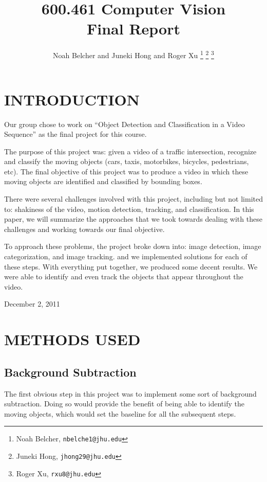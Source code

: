\documentclass[a4paper, 10pt, conference]{ieeeconf}      %
\title{\LARGE \bf
600.461 Computer Vision\\Final Report
}
\author{Noah Belcher and Juneki Hong and Roger Xu%
\thanks{Noah Belcher,
        {\tt\small nbelche1@jhu.edu}}%
\thanks{Juneki Hong,
        {\tt\small jhong29@jhu.edu}}%
\thanks{Roger Xu,
		{\tt\small rxu8@jhu.edu}}%
}
\begin{document}
\maketitle
\thispagestyle{empty}
\pagestyle{empty}


\section{INTRODUCTION}

Our group chose to work on “Object Detection and Classification in a Video Sequence” as the final project for this course. \newline

The purpose of this project was: given a video of a traffic intersection, recognize and classify the moving objects (cars, taxis, motorbikes, bicycles, pedestrians, etc). The final objective of this project was to produce a video in which these moving objects are identified and classified by bounding boxes. \newline

There were several challenges involved with this project, including but not limited to: shakiness of the video, motion detection, tracking, and classification. In this paper, we will summarize the approaches that we took towards dealing with these challenges and working towards our final objective. \newline


To approach these problems, the project broke down into: image detection, image categorization, and image tracking. and we implemented solutions for each of these steps. With everything put together, we produced some decent results. We were able to identify and even track the objects that appear throughout the video. 


\hfill December 2, 2011


\section{METHODS USED}

\subsection{Background Subtraction}
The first obvious step in this project was to implement some sort of background subtraction. Doing so would provide the benefit of being able to identify the moving objects, which would set the baseline for all the subsequent steps. \newline
\end{document}
